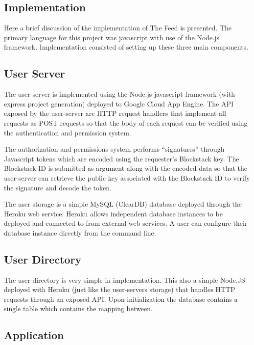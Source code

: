 \documentclass[pageno]{jpaper}
\newcommand{\quotes}[1]{``#1''}
\begin{document}
\begin{multicols*}{2}
\section{Implementation}
\label{section:implementation}

Here a brief discussion of the implementation of The Feed is presented. The primary language for this project was javascript with use of the Node.js framework. Implementation consisted of setting up these three main components.

\subsection{User Server}
\label{section:server}

The user-server is implemented using the Node.js javascript framework (with express project generation) deployed to Google Cloud App Engine. The API exposed by the user-server are HTTP request handlers that implement all requests as POST requests so that the body of each request can be verified using the authentication and permission system.\par
The authorization and permissions system performs \quotes{signatures} through Javascript tokens which are encoded using the requester's Blockstack key. The Blockstack ID is submitted as argument along with the encoded data so that the user-server can retrieve the public key associated with the Blockstack ID to verify the signature and decode the token.\par 
The user storage is a simple MySQL (ClearDB) database deployed through the Heroku web service. Heroku allows independent database instances to be deployed and connected to from external web services. A user can configure their database instance directly from the command line.\par

\subsection{User Directory}
\label{section:directory}

The user-directory is very simple in implementation. This also a simple Node.JS deployed with Heroku (just like the user-servers storage) that handles HTTP requests through an exposed API. Upon initialization the database contains a single table which contains the mapping between.

\subsection{Application}
\label{section:app}


\end{multicols*}
\end{document}
